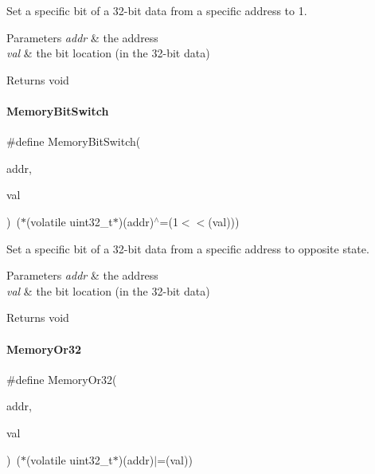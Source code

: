 Set a specific bit of a 32-\/bit data from a specific address to 1. 


\begin{DoxyParams}{Parameters}
{\em addr} & the address \\
\hline
{\em val} & the bit location (in the 32-\/bit data) \\
\hline
\end{DoxyParams}
\begin{DoxyReturn}{Returns}
void 
\end{DoxyReturn}
\mbox{\label{a00020_ae49e41753dbce64185d380d307ade78d}} 
\paragraph{\texorpdfstring{Memory\+Bit\+Switch}{MemoryBitSwitch}}
{\footnotesize\ttfamily \#define Memory\+Bit\+Switch(\begin{DoxyParamCaption}\item[{}]{addr,  }\item[{}]{val }\end{DoxyParamCaption})~($\ast$(volatile uint32\+\_\+t$\ast$)(addr)$^\wedge$=(1$<$$<$(val)))}



Set a specific bit of a 32-\/bit data from a specific address to opposite state. 


\begin{DoxyParams}{Parameters}
{\em addr} & the address \\
\hline
{\em val} & the bit location (in the 32-\/bit data) \\
\hline
\end{DoxyParams}
\begin{DoxyReturn}{Returns}
void 
\end{DoxyReturn}
\mbox{\label{a00020_a27874a97deab7cecdde5ddecf466e31e}} 
\paragraph{\texorpdfstring{Memory\+Or32}{MemoryOr32}}
{\footnotesize\ttfamily \#define Memory\+Or32(\begin{DoxyParamCaption}\item[{}]{addr,  }\item[{}]{val }\end{DoxyParamCaption})~($\ast$(volatile uint32\+\_\+t$\ast$)(addr)$\vert$=(val))}



